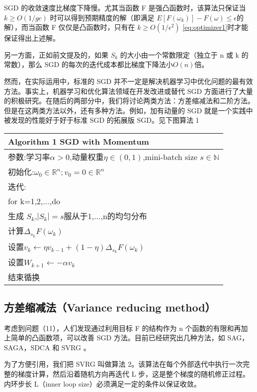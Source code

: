 \documentclass{book}
\begin{document}
SGD 的收敛速度比梯度下降慢。尤其当函数 F 是强凸函数时，该算法只保证当 $k\geq O(1/gc)$ 时可以得到预期精度的解（即满足 $E[F(\omega_k)]-F(\omega) ≤ \epsilon$的解），而当函数 F 仅仅是凸函数时，只有在 $k \geq O(1/\epsilon^2)$ \ref{eq:optimizer1}时才能保证得出上述解。

另一方面，正如前文提及的，如果 $S_k$ 的大小由一个常数限定（独立于 n 或 k 的常数），那么 SGD 的每次的迭代成本都比梯度下降法小$O(n)$倍。

然而，在实际运用中，标准的 SGD 并不一定是解决机器学习中优化问题的最有效方法。事实上，机器学习和优化算法领域在开发改进或替代 SGD 方面进行了大量的积极研究。在随后的两部分中，我们将讨论两类方法：方差缩减法和二阶方法。但是在这两类方法以外，还有多种方法。例如，加有动量的 SGD 就是一个实践中被发现的性能好于好于标准 SGD 的拓展版 SGD。见下图算法 1

\begin{tabular}{l}
	\hline
	Algorithm 1 SGD with Momentum\\
	\hline
	参数:学习率$\alpha>0$,动量权重$\eta\in(0,1)$,mini-batch size $s\in\mathbb{N}$\\
	初始化:$\omega_0\in\mathbb{R}^n;v_0=0\in\mathbb{R}^n$\\
	迭代:\\
	for k=1,2,$\ldots$,do\\
	  生成 $S_k$,$|S_k|=s$服从于{1,$\ldots$,n}的均匀分布\\
	  计算$\Delta_{s_k}F(\omega_k)$\\
	  设置$v_k\leftarrow \eta v_{k-1}+(1-\eta)\Delta_{s_k}F(\omega_k)$\\
	  设置$W_{k+1}\leftarrow-\alpha v_k$\\
	结束循换\\
	\hline
\end{tabular}


\subsection{ 方差缩减法（Variance reducing method）}

考虑到问题（11），人们发现通过利用目标 F 的结构作为 n 个函数的有限和再加上简单的凸函数项，可以改善 SGD 方法。目前已经研究出几种方法，如 SAG，SAGA，SDCA 和 SVRG 。

为了方便引用，我们把 SVRG 叫做算法 2。该算法在每个外部迭代中执行一次完整的梯度计算，然后沿着随机方向再迭代 L 步，这是整个梯度的随机修正过程。内环步长 L（inner loop size）必须满足一定的条件以保证收敛。
\end{document}
